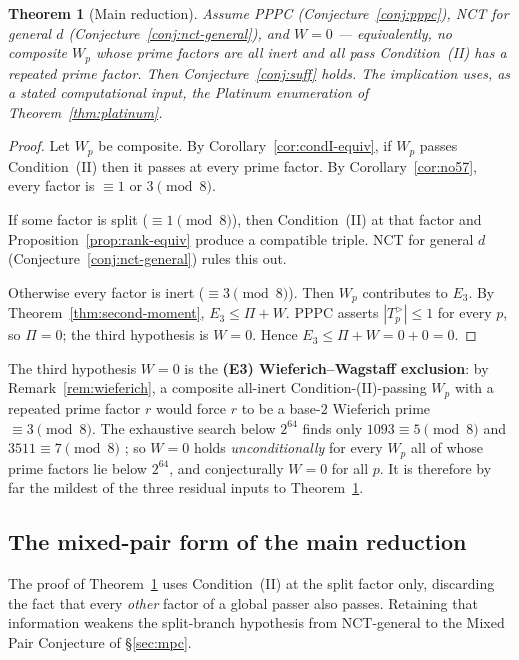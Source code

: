 \documentclass[11pt]{amsart}
\theoremstyle{plain}
\newtheorem{theorem}{Theorem}[section]
\theoremstyle{definition}
\theoremstyle{remark}
\numberwithin{equation}{section}
\begin{document}
\begin{theorem}[Main reduction]\label{thm:main}
Assume PPPC (Conjecture~\ref{conj:pppc}), NCT for general $d$ (Conjecture~\ref{conj:nct-general}), and $W = 0$ --- equivalently, no composite $W_p$ whose prime factors are all inert and all pass Condition~(II) has a repeated prime factor. Then Conjecture~\ref{conj:suff} holds. The implication uses, as a stated computational input, the Platinum enumeration of Theorem~\ref{thm:platinum}.
\end{theorem}

\begin{proof}
Let $W_p$ be composite. By Corollary~\ref{cor:condI-equiv}, if $W_p$ passes Condition~(II) then it passes at every prime factor. By Corollary~\ref{cor:no57}, every factor is $\equiv 1$ or $3 \pmod 8$.

If some factor is split ($\equiv 1 \pmod 8$), then Condition~(II) at that factor and Proposition~\ref{prop:rank-equiv} produce a compatible triple. NCT for general $d$ (Conjecture~\ref{conj:nct-general}) rules this out.

Otherwise every factor is inert ($\equiv 3 \pmod 8$). Then $W_p$ contributes to $E_3$. By Theorem~\ref{thm:second-moment}, $E_3 \leq \Pi + W$. PPPC asserts $|T_p^{>}| \leq 1$ for every $p$, so $\Pi = 0$; the third hypothesis is $W = 0$. Hence $E_3 \leq \Pi + W = 0 + 0 = 0$.
\end{proof}

The third hypothesis $W = 0$ is the \textbf{(E3) Wieferich--Wagstaff exclusion}: by Remark~\ref{rem:wieferich}, a composite all-inert Condition-(II)-passing $W_p$ with a repeated prime factor $r$ would force $r$ to be a base-$2$ Wieferich prime $\equiv 3 \pmod 8$. The exhaustive search below $2^{64}$ finds only $1093\equiv5\pmod8$ and $3511\equiv7\pmod8$ \cite{ref:OEISWieferich}; so $W = 0$ holds \emph{unconditionally} for every $W_p$ all of whose prime factors lie below $2^{64}$, and conjecturally $W = 0$ for all $p$. It is therefore by far the mildest of the three residual inputs to Theorem~\ref{thm:main}.

\subsection{The mixed-pair form of the main reduction}\label{sec:main-mpc}

The proof of Theorem~\ref{thm:main} uses Condition~(II) at the split factor only, discarding the fact that every \emph{other} factor of a global passer also passes. Retaining that information weakens the split-branch hypothesis from NCT-general to the Mixed Pair Conjecture of \S\ref{sec:mpc}.
\end{document}

